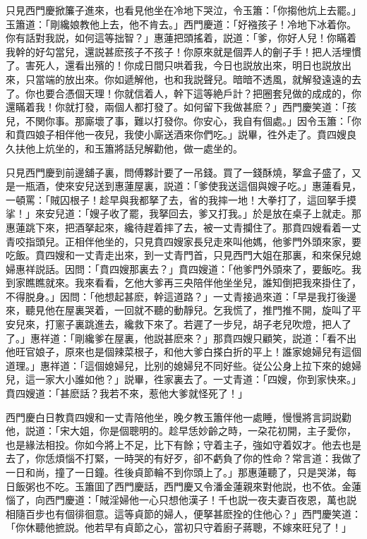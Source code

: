 只見西門慶掀簾子進來，也看見他坐在冷地下哭泣，令玉簫：「你搊他炕上去罷。」玉簫道：「剛纔娘教他上去，他不肯去。」西門慶道：「好襁孩子！冷地下冰着你。你有話對我説，如何這等拙智？」惠蓮把頭搖着，説道：「爹，你好人兒！你瞞着我幹的好勾當兒，還説甚麽孩子不孩子！你原來就是個弄人的劊子手！把人活埋慣了。害死人，還看出殯的！你成日間只哄着我，今日也説放出來，明日也説放出來，只當端的放出來。你如遞解他，也和我説聲兒。暗暗不透風，就解發遠遠的去了。你也要合憑個天理！你就信着人，幹下這等絶戶計？把圈套兒做的成成的，你還瞞着我！你就打發，兩個人都打發了。如何留下我做甚麽？」西門慶笑道：「孩兒，不関你事。那廝壞了事，難以打發你。你安心，我自有個處。」因令玉簫：「你和賁四娘子相伴他一夜兒，我使小廝送酒來你們吃。」説畢，徃外走了。賁四嫂良久扶他上炕坐的，和玉簫將話兒解勸他，做一處坐的。

只見西門慶到前邊舖子裏，問傅夥計要了一吊錢。買了一錢酥燒，拏盒子盛了，又是一瓶酒，使來安兒送到惠蓮屋裏，説道：「爹使我送這個與嫂子吃。」惠蓮看見，一頓罵：「賊囚根子！趁早與我都拏了去，省的我摔一地！大拳打了，這回拏手摸挲！」來安兒道：「嫂子收了罷，我拏回去，爹又打我。」於是放在桌子上就走。那惠蓮跳下來，把酒拏起來，纔待趕着摔了去，被一丈青攔住了。那賁四嫂看着一丈青咬指頭兒。正相伴他坐的，只見賁四嫂家長兒走來叫他媽，他爹門外頭來家，要吃飯。賁四嫂和一丈青走出來，到一丈青門首，只見西門大姐在那裏，和來保兒媳婦惠祥説話。因問：「賁四嫂那裏去？」賁四嫂道：「他爹門外頭來了，要飯吃。我到家瞧瞧就來。我來看看，乞他大爹再三央陪伴他坐坐兒，誰知倒把我來掛住了，不得脱身。」因問：「他想起甚麽，幹這道路？」一丈青接過來道：「早是我打後邊來，聽見他在屋裏哭着，一回就不聽的動靜兒。乞我慌了，推門推不開，旋叫了平安兒來，打窻子裏跳進去，纔救下來了。若遲了一步兒，胡子老兒吹燈，把人了了。」惠祥道：「剛纔爹在屋裏，他説甚麽來？」那賁四嫂只顧笑，説道：「看不出他旺官娘子，原來也是個辣菜根子，和他大爹白搽白折的平上！誰家媳婦兒有這個道理。」惠祥道：「這個媳婦兒，比别的媳婦兒不同好些。従公公身上拉下來的媳婦兒，這一家大小誰如他？」説畢，徃家裏去了。一丈青道：「四嫂，你到家快來。」賁四嫂道：「甚麽話？我若不來，惹他大爹就怪死了！」

西門慶白日教賁四嫂和一丈青陪他坐，晚夕教玉簫伴他一處睡，慢慢將言詞説勸他，説道：「宋大姐，你是個聰明的。趁早恁妙齡之時，一朶花初開，主子愛你，也是緣法相投。你如今將上不足，比下有餘；守着主子，強如守着奴才。他去也是去了，你恁煩惱不打緊，一時哭的有好歹，卻不虧負了你的性命？常言道：我做了一日和尚，撞了一日鐘。徃後貞節輪不到你頭上了。」那惠蓮聽了，只是哭涕，每日飯粥也不吃。玉簫囬了西門慶話，西門慶又令潘金蓮親來對他説，也不依。金蓮惱了，向西門慶道：「賊淫婦他一心只想他漢子！千也説一夜夫妻百夜恩，萬也説相隨百步也有個徘徊意。這等貞節的婦人，便拏甚麽拴的住他心？」西門慶笑道：「你休聽他摭説。他若早有貞節之心，當初只守着廚子蔣聰，不嫁來旺兒了！」

